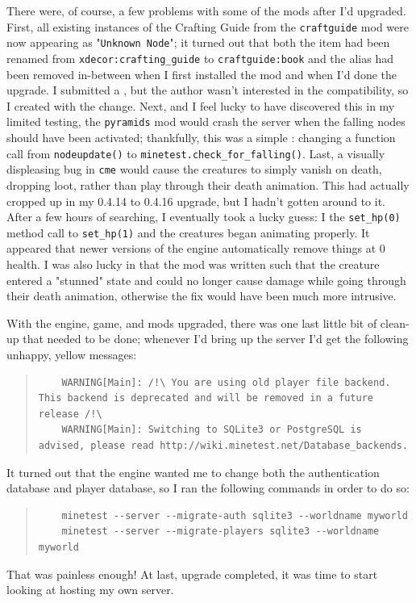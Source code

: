 \documentclass{article}
\begin{document}
There were, of course, a few problems with some of the mods after I'd upgraded.  First, all existing instances of the Crafting Guide from the \texttt{craftguide} mod were now appearing as "\texttt{Unknown Node}"; it turned out that both the item had been renamed from \texttt{xdecor:crafting_guide} to \texttt{craftguide:book} and the alias had been removed in-between when I first installed the mod and when I'd done the upgrade.  I submitted a , but the author wasn't interested in the compatibility, so I created  with the change.  Next, and I feel lucky to have discovered this in my limited testing, the \texttt{pyramids} mod would crash the server when the falling nodes should have been activated; thankfully, this was a simple : changing a function call from \texttt{nodeupdate()} to \texttt{minetest.check_for_falling()}.  Last, a visually displeasing bug in \texttt{cme} would cause the creatures to simply vanish on death, dropping loot, rather than play through their death animation.  This had actually cropped up in my 0.4.14 to 0.4.16 upgrade, but I hadn't gotten around to it.  After a few hours of searching, I eventually took a lucky guess: I  the \texttt{set_hp(0)} method call to \texttt{set_hp(1)} and the creatures began animating properly.  It appeared that newer versions of the engine automatically remove things at 0 health.  I was also lucky in that the mod was written such that the creature entered a "stunned" state and could no longer cause damage while going through their death animation, otherwise the fix would have been much more intrusive.

With the engine, game, and mods upgraded, there was one last little bit of clean-up that needed to be done; whenever I'd bring up the server I'd get the following unhappy, yellow messages:
\begin{quote}
\begin{verbatim}
	WARNING[Main]: /!\ You are using old player file backend. This backend is deprecated and will be removed in a future release /!\
	WARNING[Main]: Switching to SQLite3 or PostgreSQL is advised, please read http://wiki.minetest.net/Database_backends.
\end{verbatim}
\end{quote}
It turned out that the engine wanted me to change both the authentication database and player database, so I ran the following commands in order to do so:
\begin{quote}
\begin{verbatim}
	minetest --server --migrate-auth sqlite3 --worldname myworld
	minetest --server --migrate-players sqlite3 --worldname myworld
\end{verbatim}
\end{quote}
That was painless enough!  At last, upgrade completed, it was time to start looking at hosting my own server.
\end{document}
